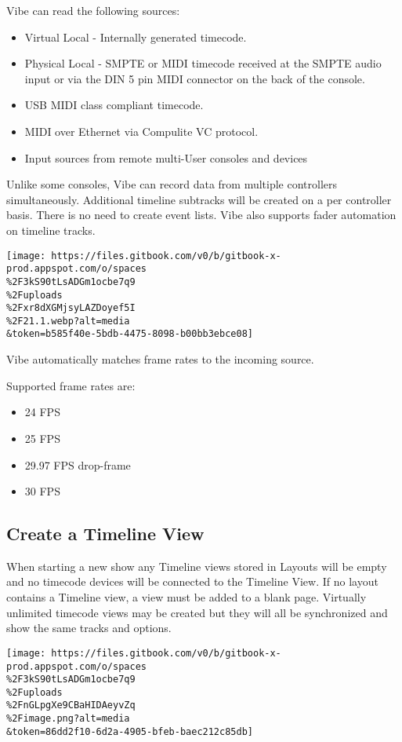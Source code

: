 \documentclass[
]{article}
\begin{document}
Vibe can read the following sources:

\begin{itemize}
\item
  Virtual Local - Internally generated timecode.
\item
  Physical Local - SMPTE or MIDI timecode received at the SMPTE audio input or via the DIN 5 pin MIDI connector on the back of the console.
\item
  USB MIDI class compliant timecode.
\item
  MIDI over Ethernet via Compulite VC protocol.
\item
  Input sources from remote multi-User consoles and devices
\end{itemize}

Unlike some consoles, Vibe can record data from multiple controllers simultaneously. Additional timeline subtracks will be created on a per controller basis. There is no need to create event lists. Vibe also supports fader automation on timeline tracks.

\texttt{[image: https://files.gitbook.com/v0/b/gitbook-x-prod.appspot.com/o/spaces\\\%2F3kS90tLsADGm1ocbe7q9\\\%2Fuploads\\\%2Fxr8dXGMjsyLAZDoyef5I\\\%2F21.1.webp?alt=media\\\&token=b585f40e-5bdb-4475-8098-b00bb3ebce08]}

Vibe automatically matches frame rates to the incoming source.

Supported frame rates are:

\begin{itemize}
\item
  24 FPS
\item
  25 FPS
\item
  29.97 FPS drop-frame
\item
  30 FPS
\end{itemize}

\hypertarget{create-a-timeline-view}{%
\subsection{Create a Timeline View}\label{create-a-timeline-view}}

When starting a new show any Timeline views stored in Layouts will be empty and no timecode devices will be connected to the Timeline View. If no layout contains a Timeline view, a view must be added to a blank page. Virtually unlimited timecode views may be created but they will all be synchronized and show the same tracks and options.

\texttt{[image: https://files.gitbook.com/v0/b/gitbook-x-prod.appspot.com/o/spaces\\\%2F3kS90tLsADGm1ocbe7q9\\\%2Fuploads\\\%2FnGLpgXe9CBaHIDAeyvZq\\\%2Fimage.png?alt=media\\\&token=86dd2f10-6d2a-4905-bfeb-baec212c85db]}
\end{document}
